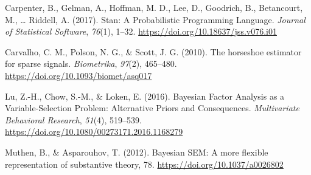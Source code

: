 \documentclass[
  english,
  man]{apa6}
\newlength{\cslhangindent}
\newlength{\cslentryspacingunit} %
\newenvironment{CSLReferences}[2] %
 {%
  \setlength{\parindent}{0pt}
  \ifodd #1
  \let\oldpar\par
  \def\par{\hangindent=\cslhangindent\oldpar}
  \fi
  \setlength{\parskip}{#2\cslentryspacingunit}
 }%
 {}
\begin{document}
\hypertarget{refs}{}
\begin{CSLReferences}{1}{0}
\leavevmode{}%
Carpenter, B., Gelman, A., Hoffman, M. D., Lee, D., Goodrich, B., Betancourt, M., \ldots{} Riddell, A. (2017). Stan: {A} {Probabilistic} {Programming} {Language}. \emph{Journal of Statistical Software}, \emph{76}(1), 1--32. \url{https://doi.org/10.18637/jss.v076.i01}

\leavevmode{}%
Carvalho, C. M., Polson, N. G., \& Scott, J. G. (2010). The horseshoe estimator for sparse signals. \emph{Biometrika}, \emph{97}(2), 465--480. \url{https://doi.org/10.1093/biomet/asq017}

\leavevmode{}%
Lu, Z.-H., Chow, S.-M., \& Loken, E. (2016). Bayesian {Factor} {Analysis} as a {Variable}-{Selection} {Problem}: {Alternative} {Priors} and {Consequences}. \emph{Multivariate Behavioral Research}, \emph{51}(4), 519--539. \url{https://doi.org/10.1080/00273171.2016.1168279}

\leavevmode{}%
Muthen, B., \& Asparouhov, T. (2012). Bayesian {SEM}: {A} more ﬂexible representation of substantive theory, 78. \url{https://doi.org/10.1037/a0026802}

\end{CSLReferences}

\endgroup
\end{document}

